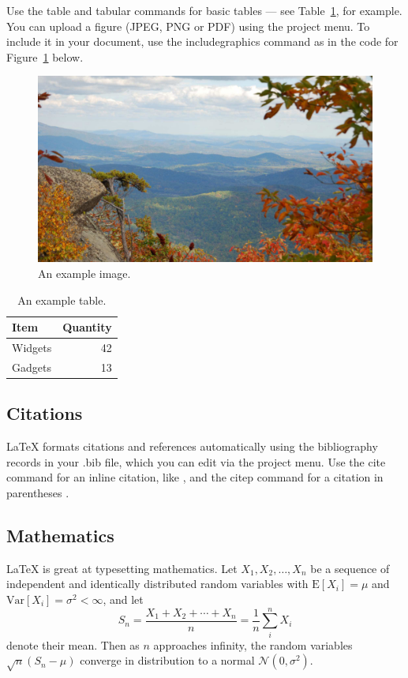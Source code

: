\documentclass[fleqn,10pt]{wlpeerj}
\begin{document}
Use the table and tabular commands for basic tables --- see Table~\ref{tab:widgets}, for example. You can upload a figure (JPEG, PNG or PDF) using the project menu. To include it in your document, use the includegraphics command as in the code for Figure~\ref{fig:view} below.

\begin{figure}[ht]
\centering
\includegraphics[width=\linewidth]{view}
\caption{An example image.}
\label{fig:view}
\end{figure}

\begin{table}[ht]
\centering
\begin{tabular}{l|r}
Item & Quantity \\\hline
Widgets & 42 \\
Gadgets & 13
\end{tabular}
\caption{\label{tab:widgets}An example table.}
\end{table}

\subsection*{Citations}

LaTeX formats citations and references automatically using the bibliography records in your .bib file, which you can edit via the project menu. Use the cite command for an inline citation, like \cite{Figueredo:2009dg}, and the citep command for a citation in parentheses \citep{Figueredo:2009dg}.

\subsection*{Mathematics}

\LaTeX{} is great at typesetting mathematics. Let $X_1, X_2, \ldots, X_n$ be a sequence of independent and identically distributed random variables with $\text{E}[X_i] = \mu$ and $\text{Var}[X_i] = \sigma^2 < \infty$, and let
$$S_n = \frac{X_1 + X_2 + \cdots + X_n}{n}
      = \frac{1}{n}\sum_{i}^{n} X_i$$
denote their mean. Then as $n$ approaches infinity, the random variables $\sqrt{n}(S_n - \mu)$ converge in distribution to a normal $\mathcal{N}(0, \sigma^2)$.
\end{document}
